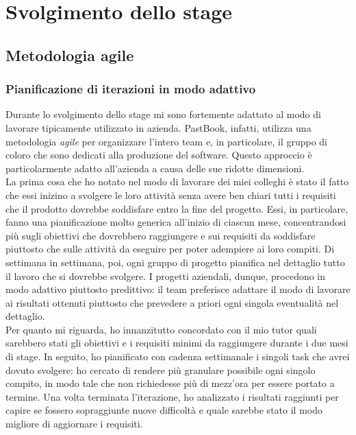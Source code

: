 \chapter{Svolgimento dello stage}
	\section{Metodologia agile}
		\subsection{Pianificazione di iterazioni in modo adattivo}
			Durante lo svolgimento dello stage mi sono fortemente adattato al modo di lavorare tipicamente utilizzato in azienda.
			PastBook, infatti, utilizza una metodologia \emph{agile} per organizzare l'intero team e, in particolare, il gruppo di coloro
			che sono dedicati alla produzione del software. Questo approccio è particolarmente adatto all'azienda a causa delle sue
			ridotte dimensioni.\\
			La prima cosa che ho notato nel modo di lavorare dei miei colleghi è stato il fatto che essi inizino a svolgere le loro
			attività senza avere ben chiari tutti i requisiti che il prodotto dovrebbe soddisfare entro la fine del progetto.
			Essi, in particolare, fanno una pianificazione molto generica all'inizio di ciascun mese, concentrandosi più sugli
			obiettivi che dovrebbero raggiungere e sui requisiti da soddisfare piuttosto che sulle attività da eseguire per poter
			adempiere ai loro compiti. Di settimana in settimana, poi, ogni gruppo di progetto pianifica nel dettaglio tutto il lavoro
			che si dovrebbe svolgere. I progetti aziendali, dunque, procedono in modo adattivo piuttosto predittivo: il team preferisce
			adattare il modo di lavorare ai risultati ottenuti piuttosto che prevedere a priori ogni singola eventualità nel dettaglio.\\
			Per quanto mi riguarda, ho innanzitutto concordato con il mio tutor quali sarebbero stati gli obiettivi e i requisiti minimi
			da raggiungere durante i due mesi di stage. In seguito, ho pianificato con cadenza settimanale i singoli task che avrei
			dovuto svolgere: ho cercato di rendere più granulare possibile ogni singolo compito, in modo tale che non richiedesse più di
			mezz'ora per essere portato a termine. Una volta terminata l'iterazione, ho analizzato i risultati raggiunti per capire se
			fossero sopraggiunte nuove difficoltà e quale sarebbe stato il modo migliore di aggiornare i requisiti.
